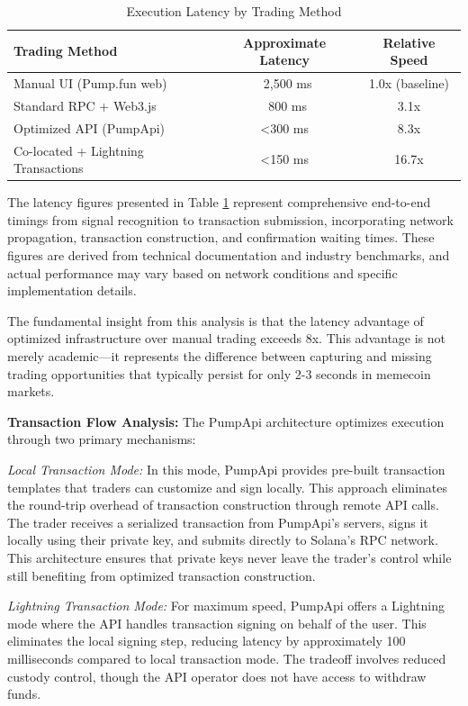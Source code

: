 \documentclass[12pt,a4paper]{article}
\begin{document}
\begin{table}[htbp]
\centering
\caption{Execution Latency by Trading Method}
\label{tab:latency-comparison}
\begin{tabular}{@{}lcc@{}}
\toprule
Trading Method & Approximate Latency & Relative Speed \\
\midrule
Manual UI (Pump.fun web) & ~2,500 ms & 1.0x (baseline) \\
Standard RPC + Web3.js & ~800 ms & 3.1x \\
Optimized API (PumpApi) & <300 ms & 8.3x \\
Co-located + Lightning Transactions & <150 ms & 16.7x \\
\bottomrule
\end{tabular}
\end{table}

The latency figures presented in Table \ref{tab:latency-comparison} represent comprehensive end-to-end timings from signal recognition to transaction submission, incorporating network propagation, transaction construction, and confirmation waiting times. These figures are derived from technical documentation and industry benchmarks, and actual performance may vary based on network conditions and specific implementation details.

The fundamental insight from this analysis is that the latency advantage of optimized infrastructure over manual trading exceeds 8x. This advantage is not merely academic—it represents the difference between capturing and missing trading opportunities that typically persist for only 2-3 seconds in memecoin markets.

\textbf{Transaction Flow Analysis:} The PumpApi architecture optimizes execution through two primary mechanisms:

\textit{Local Transaction Mode:} In this mode, PumpApi provides pre-built transaction templates that traders can customize and sign locally. This approach eliminates the round-trip overhead of transaction construction through remote API calls. The trader receives a serialized transaction from PumpApi's servers, signs it locally using their private key, and submits directly to Solana's RPC network. This architecture ensures that private keys never leave the trader's control while still benefiting from optimized transaction construction.

\textit{Lightning Transaction Mode:} For maximum speed, PumpApi offers a Lightning mode where the API handles transaction signing on behalf of the user. This eliminates the local signing step, reducing latency by approximately 100 milliseconds compared to local transaction mode. The tradeoff involves reduced custody control, though the API operator does not have access to withdraw funds.
\end{document}
